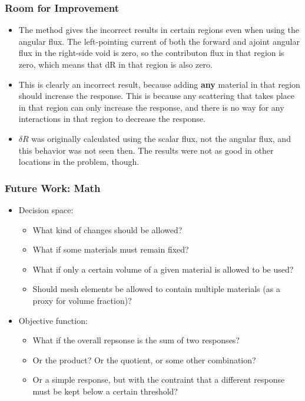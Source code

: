 \documentclass[t]{beamer}
\begin{document}
\begin{frame}
  \frametitle{Room for Improvement}
  \begin{itemize}
  \item The method gives the incorrect results in certain regions even when
        using the angular flux. The left-pointing current of both the forward
        and ajoint angular flux in the right-side void is zero, so the
        contributon flux in that region is zero, which means that dR in that
        region is also zero.
  \item This is clearly an incorrect result, because adding \textbf{any}
        material in that region should increase the response. This is because
        any scattering that takes place in that region can only increase the
        response, and there is no way for any interactions in that region to
        decrease the response.
  \item $\delta R$ was originally calculated using the scalar flux, not the
        angular flux, and this behavior was not seen then. The results were not
        as good in other locations in the problem, though.
  \end{itemize}
\end{frame}


\begin{frame}
  \frametitle{Future Work: Math}
  \begin{itemize}
    \item Decision space:
    \begin{itemize}
      \item What kind of changes should be allowed?
      \item What if some materials must remain fixed?
      \item What if only a certain volume of a given material is allowed to be
            used?
      \item Should mesh elements be allowed to contain multiple materials (as a
            proxy for volume fraction)?
    \end{itemize}
    \item Objective function:
    \begin{itemize}
      \item What if the overall repsonse is the sum of two responses?
      \item Or the product? Or the quotient, or some other combination?
      \item Or a simple response, but with the contraint that a different
            response must be kept below a certain threshold?
    \end{itemize}
  \end{itemize}
\end{frame}
\end{document}
